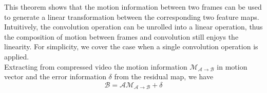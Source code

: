 \documentclass[titlepage]{article}
\begin{document}




This theorem shows that the motion information between two frames can be used to generate a linear transformation between the corresponding two feature maps. 
Intuitively, the convolution operation can be unrolled into a linear operation, thus the composition of motion between frames and convolution still enjoys the linearity.
For simplicity, we cover the case when a single convolution operation is applied.\\






Extracting from compressed video the motion information $\mathcal{M}_{\mathcal{A} \to \mathcal{B}}$ in motion vector and the error information $\delta$ from the residual map, we have 
\begin{equation}
    \mathcal{B} = \mathcal{A}\mathcal{M}_{\mathcal{A} \to \mathcal{B}} + \mathcal{\delta} 
\end{equation}

\end{document}
